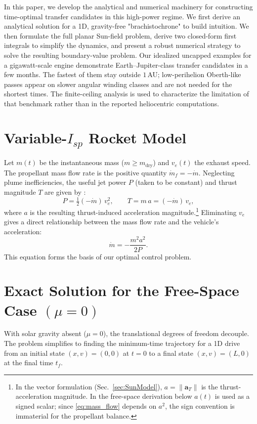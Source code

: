 \documentclass[journal,a4paper]{IEEEtran}
\begin{document}
In this paper, we develop the analytical and numerical machinery for constructing time-optimal transfer candidates in this high-power regime. We first derive an analytical solution for a 1D, gravity-free "brachistochrone" to build intuition. We then formulate the full planar Sun-field problem, derive two closed-form first integrals to simplify the dynamics, and present a robust numerical strategy to solve the resulting boundary-value problem. Our idealized uncapped examples for a gigawatt-scale engine demonstrate Earth--Jupiter-class transfer candidates in a few months. The fastest of them stay outside \(1\)\,AU; low-perihelion Oberth-like passes appear on slower angular winding classes and are not needed for the shortest times. The finite-ceiling analysis is used to characterize the limitation of that benchmark rather than in the reported heliocentric computations.

\section{Variable-$I_{\!sp}$ Rocket Model}
Let $m(t)$ be the instantaneous mass ($m \ge m_\mathrm{dry}$) and $v_e(t)$ the exhaust speed. The propellant mass flow rate is the positive quantity $\dot m_f = -\dot m$. Neglecting plume inefficiencies, the useful jet power $P$ (taken to be constant) and thrust magnitude $T$ are given by \cite{Sutton2017}:
\begin{equation}
  P = \tfrac12 (-\dot m)\,v_e^{2},\qquad
  T   = m\,a = (-\dot m)\,v_e,
  \label{eq:power_thrust}
\end{equation}
where $a$ is the resulting thrust-induced acceleration magnitude.\footnote{In the vector formulation (Sec.~\ref{sec:SunModel}), \(a=\|\mathbf{a}_T\|\) is the thrust-acceleration magnitude. In the free-space derivation below \(a(t)\) is used as a signed scalar; since \eqref{eq:mass_flow} depends on \(a^2\), the sign convention is immaterial for the propellant balance.} Eliminating $v_e$ gives a direct relationship between the mass flow rate and the vehicle's acceleration:
\begin{equation}
  \dot m = -\frac{m^{2}a^{2}}{2P}.
  \label{eq:mass_flow}
\end{equation}
This equation forms the basis of our optimal control problem.

\section{Exact Solution for the Free-Space Case $(\mu=0)$}
\label{sec:free_space_solution}
With solar gravity absent ($\mu=0$), the translational degrees of freedom decouple. The problem simplifies to finding the minimum-time trajectory for a 1D drive from an initial state $(x, v) = (0, 0)$ at $t=0$ to a final state $(x, v) = (L, 0)$ at the final time $t_f$.
\end{document}
